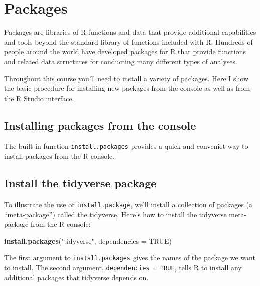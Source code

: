 \documentclass[]{book}
\newenvironment{Shaded}{\begin{snugshade}}{\end{snugshade}}
\newcommand{\DataTypeTok}[1]{\textcolor[rgb]{0.13,0.29,0.53}{#1}}
\newcommand{\KeywordTok}[1]{\textcolor[rgb]{0.13,0.29,0.53}{\textbf{#1}}}
\newcommand{\NormalTok}[1]{#1}
\newcommand{\OtherTok}[1]{\textcolor[rgb]{0.56,0.35,0.01}{#1}}
\newcommand{\StringTok}[1]{\textcolor[rgb]{0.31,0.60,0.02}{#1}}
\theoremstyle{definition}
\theoremstyle{definition}
\theoremstyle{definition}
\theoremstyle{remark}
\begin{document}
\hypertarget{packages}{%
\section{Packages}\label{packages}}

Packages are libraries of R functions and data that provide additional
capabilities and tools beyond the standard library of functions included
with R. Hundreds of people around the world have developed packages for
R that provide functions and related data structures for conducting many
different types of analyses.

Throughout this course you'll need to install a variety of packages.
Here I show the basic procedure for installing new packages from the
console as well as from the R Studio interface.

\hypertarget{installing-packages-from-the-console}{%
\subsection{Installing packages from the
console}\label{installing-packages-from-the-console}}

The built-in function \texttt{install.packages} provides a quick and
conveniet way to install packages from the R console.

\hypertarget{install-the-tidyverse-package}{%
\subsection{Install the tidyverse
package}\label{install-the-tidyverse-package}}

To illustrate the use of \texttt{install.package}, we'll install a
collection of packages (a ``meta-package'') called the
\href{http://www.tidyverse.org}{tidyverse}. Here's how to install the
tidyverse meta-package from the R console:

\begin{Shaded}
\begin{Highlighting}[]
\KeywordTok{install.packages}\NormalTok{(}\StringTok{"tidyverse"}\NormalTok{, }\DataTypeTok{dependencies =} \OtherTok{TRUE}\NormalTok{)}
\end{Highlighting}
\end{Shaded}

The first argument to \texttt{install.packages} gives the names of the
package we want to install. The second argument,
\texttt{dependencies\ =\ TRUE}, tells R to install any additional
packages that tidyverse depends on.
\end{document}
